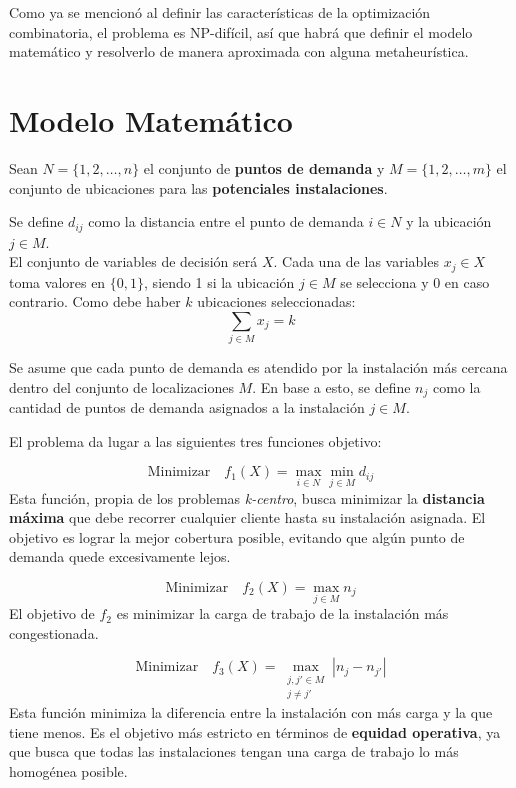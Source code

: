 \documentclass[12pt,a4paper]{book}
\begin{document}
Como ya se mencionó al definir las características de la optimización combinatoria, el problema es NP-difícil, así
que habrá que definir el modelo matemático y resolverlo de manera aproximada con alguna metaheurística.
\section{Modelo Matemático}
Sean $N=\{1, 2, \dots, n\}$ el conjunto de \textbf{puntos de demanda} y $M=\{1, 2, \dots, m\}$ el conjunto de ubicaciones para las \textbf{potenciales instalaciones}.

Se define $d_{ij}$ como la distancia entre el punto de demanda $i \in N$ y la ubicación $j \in M$.\\
El conjunto de variables de decisión será $X$. Cada una de las variables $x_j \in X$ toma valores en $\{0,1\}$, siendo 1 si la ubicación $j \in M$ se selecciona y 0 en caso contrario. Como debe haber $k$ ubicaciones seleccionadas:
\begin{equation}
    \sum_{j \in M} x_j = k
\end{equation}

Se asume que cada punto de demanda es atendido por la instalación más cercana dentro del conjunto de localizaciones $M$. En base a esto, se define $n_j$ como la cantidad de puntos de demanda asignados a la instalación $j \in M$.

El problema da lugar a las siguientes tres funciones objetivo:

\begin{equation}
    \text{Minimizar} \quad f_1(X) = \max_{i \in N} \min_{j \in M} d_{ij}
    \label{eq:f1}
\end{equation}
Esta función, propia de los problemas \textit{k-centro}, busca minimizar la \textbf{distancia máxima} que debe recorrer cualquier cliente hasta su instalación asignada. El objetivo es lograr la mejor cobertura posible, evitando que algún punto de demanda quede excesivamente lejos.

\begin{equation}
    \text{Minimizar} \quad f_2(X) = \max_{j \in M} n_j
    \label{eq:f2}
\end{equation}
El objetivo de $f_2$ es minimizar la carga de trabajo de la instalación más congestionada. 

\begin{equation}
    \text{Minimizar} \quad f_3(X) = \max_{\substack{j, j' \in M \\ j \neq j'}} |n_j - n_{j'}|
    \label{eq:f3}
\end{equation}
Esta función minimiza la diferencia entre la instalación con más carga y la que tiene menos. Es el objetivo más estricto en términos de \textbf{equidad operativa}, ya que busca que todas las instalaciones tengan una carga de trabajo lo más homogénea posible.
\end{document}
